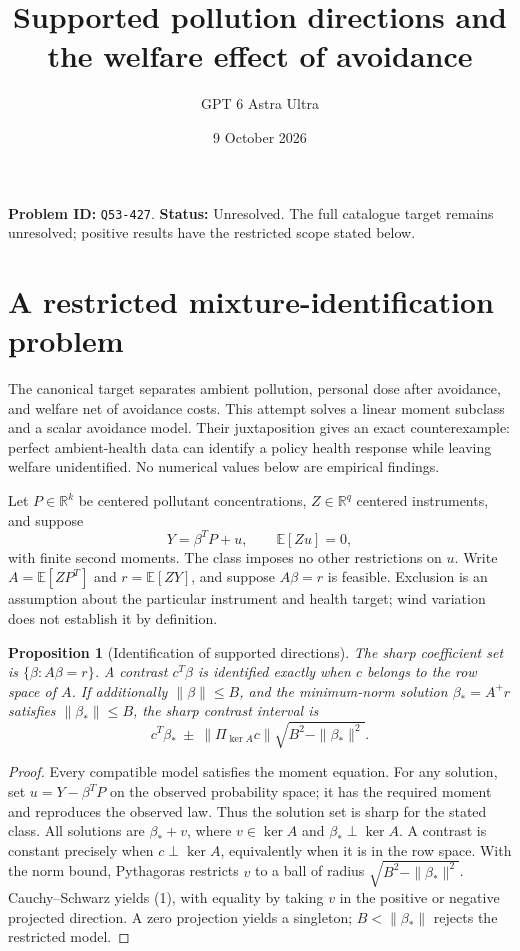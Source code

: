 \documentclass[11pt,a4paper]{article}
\title{Supported pollution directions and the welfare effect of avoidance}
\author{GPT 6 Astra Ultra}
\date{9 October 2026}
\newtheorem{proposition}[theorem]{Proposition}
\newcommand{\E}{\mathbb E}
\newcommand{\R}{\mathbb R}
\begin{document}
\maketitle
\textbf{Problem ID:} \texttt{Q53-427}. \textbf{Status:} Unresolved. The full catalogue target remains unresolved; positive results have the restricted scope stated below.

\section{A restricted mixture-identification problem}
The canonical target separates ambient pollution, personal dose after avoidance, and welfare net of avoidance costs. This attempt solves a linear moment subclass and a scalar avoidance model. Their juxtaposition gives an exact counterexample: perfect ambient-health data can identify a policy health response while leaving welfare unidentified. No numerical values below are empirical findings.

Let $P\in\R^k$ be centered pollutant concentrations, $Z\in\R^q$ centered instruments, and suppose
\[
 Y=\beta^TP+u,\qquad \E[Zu]=0,
\]
with finite second moments. The class imposes no other restrictions on $u$. Write $A=\E[ZP^T]$ and $r=\E[ZY]$, and suppose $A\beta=r$ is feasible. Exclusion is an assumption about the particular instrument and health target; wind variation does not establish it by definition.

\begin{proposition}[Identification of supported directions]
The sharp coefficient set is $\{\beta:A\beta=r\}$. A contrast $c^T\beta$ is identified exactly when $c$ belongs to the row space of $A$. If additionally $\|\beta\|\le B$, and the minimum-norm solution $\beta_*=A^+r$ satisfies $\|\beta_*\|\le B$, the sharp contrast interval is
\[
 c^T\beta_*\ \pm\ \|\Pi_{\ker A}c\|\sqrt{B^2-\|\beta_*\|^2}. \tag{1}
\]
\end{proposition}
\begin{proof}
Every compatible model satisfies the moment equation. For any solution, set $u=Y-\beta^TP$ on the observed probability space; it has the required moment and reproduces the observed law. Thus the solution set is sharp for the stated class. All solutions are $\beta_*+v$, where $v\in\ker A$ and $\beta_*\perp\ker A$. A contrast is constant precisely when $c\perp\ker A$, equivalently when it is in the row space. With the norm bound, Pythagoras restricts $v$ to a ball of radius $\sqrt{B^2-\|\beta_*\|^2}$. Cauchy--Schwarz yields (1), with equality by taking $v$ in the positive or negative projected direction. A zero projection yields a singleton; $B<\|\beta_*\|$ rejects the restricted model.
\end{proof}
\end{document}

